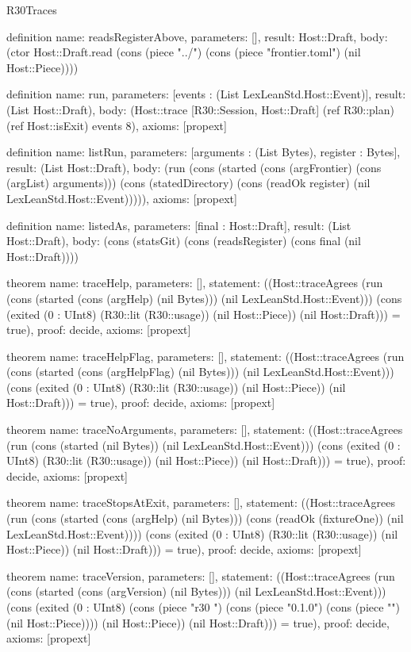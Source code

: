 \begin{lexlean}{R30Traces}
\begin{semanticmodule}
definition{
  name: readsRegisterAbove,
  parameters: [],
  result: Host::Draft,
  body: (ctor Host::Draft.read (cons (piece "../") (cons (piece "frontier.toml") (nil Host::Piece))))
}

definition{
  name: run,
  parameters: [events : (List LexLeanStd.Host::Event)],
  result: (List Host::Draft),
  body: (Host::trace [R30::Session, Host::Draft] (ref R30::plan) (ref Host::isExit) events 8),
  axioms: [propext]
}

definition{
  name: listRun,
  parameters: [arguments : (List Bytes), register : Bytes],
  result: (List Host::Draft),
  body: (run (cons (started (cons (argFrontier) (cons (argList) arguments))) (cons (statedDirectory) (cons (readOk register) (nil LexLeanStd.Host::Event))))),
  axioms: [propext]
}

definition{
  name: listedAs,
  parameters: [final : Host::Draft],
  result: (List Host::Draft),
  body: (cons (statsGit) (cons (readsRegister) (cons final (nil Host::Draft))))
}

theorem{
  name: traceHelp,
  parameters: [],
  statement: ((Host::traceAgrees (run (cons (started (cons (argHelp) (nil Bytes))) (nil LexLeanStd.Host::Event))) (cons (exited (0 : UInt8) (R30::lit (R30::usage)) (nil Host::Piece)) (nil Host::Draft))) = true),
  proof: decide{},
  axioms: [propext]
}

theorem{
  name: traceHelpFlag,
  parameters: [],
  statement: ((Host::traceAgrees (run (cons (started (cons (argHelpFlag) (nil Bytes))) (nil LexLeanStd.Host::Event))) (cons (exited (0 : UInt8) (R30::lit (R30::usage)) (nil Host::Piece)) (nil Host::Draft))) = true),
  proof: decide{},
  axioms: [propext]
}

theorem{
  name: traceNoArguments,
  parameters: [],
  statement: ((Host::traceAgrees (run (cons (started (nil Bytes)) (nil LexLeanStd.Host::Event))) (cons (exited (0 : UInt8) (R30::lit (R30::usage)) (nil Host::Piece)) (nil Host::Draft))) = true),
  proof: decide{},
  axioms: [propext]
}

theorem{
  name: traceStopsAtExit,
  parameters: [],
  statement: ((Host::traceAgrees (run (cons (started (cons (argHelp) (nil Bytes))) (cons (readOk (fixtureOne)) (nil LexLeanStd.Host::Event)))) (cons (exited (0 : UInt8) (R30::lit (R30::usage)) (nil Host::Piece)) (nil Host::Draft))) = true),
  proof: decide{},
  axioms: [propext]
}

theorem{
  name: traceVersion,
  parameters: [],
  statement: ((Host::traceAgrees (run (cons (started (cons (argVersion) (nil Bytes))) (nil LexLeanStd.Host::Event))) (cons (exited (0 : UInt8) (cons (piece "r30 ") (cons (piece "0.1.0") (cons (piece "\n") (nil Host::Piece)))) (nil Host::Piece)) (nil Host::Draft))) = true),
  proof: decide{},
  axioms: [propext]
}


\end{semanticmodule}
\end{lexlean}
